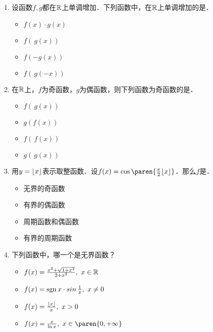 \documentclass[a4paper,punct=CCT]{ctexbook}
\theoremstyle{definition}
\theoremstyle{remark}
\newif\ifshowsol
\begin{document}
\begin{enumerate}
\item 设函数\(f, g\)都在\(\mathbb{R}\)上单调增加．下列函数中，在\(\mathbb{R}\)上单调增加的是\uline{\makebox[3em]{}}．
  \begin{itemize}
    \renewcommand{\labelitemi}{\faCircleThin}
  \item \(f(x) \cdot g(x)\)
    \ifshowsol
  \item[\faCircle] \(f(\,g(x))\)
    \else
  \item \(f(\,g(x))\)
    \fi
  \item \(f(-g(x))\)
  \item \(f(\,g(-x))\)
  \end{itemize}

\item 在\(\mathbb{R}\)上，\(f\)为奇函数，\(g\)为偶函数，则下列函数为奇函数的是\uline{\makebox[3em]{}}．
  \begin{itemize}
    \renewcommand{\labelitemi}{\faCircleThin}
  \item \(f(\,g(x))\)
  \item \(g(f(x))\)
    \ifshowsol
  \item[\faCircle] \(f(\,f(x))\)
    \else
  \item \(f(\,f(x))\)
    \fi
  \item \(g(\,g(x))\)
  \end{itemize}

\item 用\(y = \lfloor x\rfloor\)表示取整函数．设\(f(x) = \cos\paren{\frac\pi2 \floor x}\)．那么\(f\)是\uline{\makebox[4em]{}}．
  \begin{itemize}
    \renewcommand{\labelitemi}{\faCircleThin}
  \item 无界的奇函数
  \item 有界的偶函数
  \item 周期函数和偶函数
    \ifshowsol
  \item[\faCircle] 有界的周期函数
    \else
  \item 有界的周期函数
    \fi
  \end{itemize}

\item 下列函数中，哪一个是无界函数？
  \begin{itemize}
    \renewcommand{\labelitemi}{\faCircleThin}
  \item \(f(x) = \frac{x^2 + \sqrt{1+x^2}}{2 + x^2},\ x \in \mathbb{R}\)
  \item \(f(x) = \operatorname{sgn} x \cdot \operatorname{\smash{sin}} \frac1x,\ x \ne 0\)
  \item \(f(x) = \frac{\lfloor x\rfloor}{x},\ x > 0\)
    \ifshowsol
  \item[\faCircle] \(f(x) = \frac{x}{\ln x},\ x \in \paren{0,+\infty}\)
    \else
  \item \(f(x) = \frac{x}{\ln x},\ x \in \paren{0,+\infty}\)
    \fi
  \end{itemize}


\end{enumerate}
\end{document}
